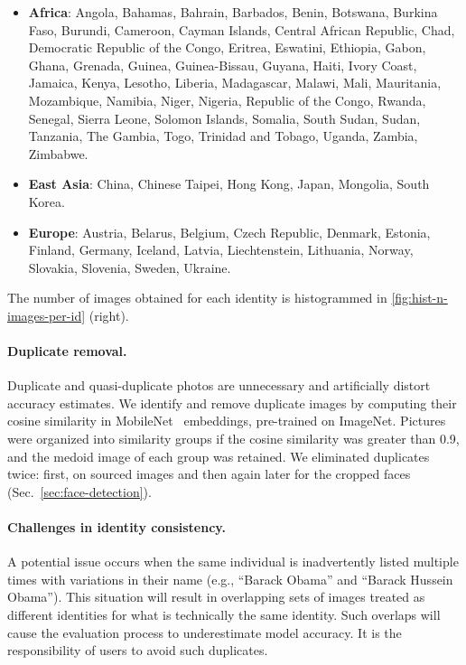 \documentclass[10pt,twocolumn,letterpaper]{article}
\begin{document}
\begin{appendices}
\begin{itemize}
    \item \textbf{Africa}: Angola, Bahamas, Bahrain, Barbados, Benin, Botswana, Burkina Faso, Burundi, Cameroon, Cayman Islands, Central African Republic, Chad, Democratic Republic of the Congo, Eritrea, Eswatini, Ethiopia, Gabon, Ghana, Grenada, Guinea, Guinea-Bissau, Guyana, Haiti, Ivory Coast, Jamaica, Kenya, Lesotho, Liberia, Madagascar, Malawi, Mali, Mauritania, Mozambique, Namibia, Niger, Nigeria, Republic of the Congo, Rwanda, Senegal, Sierra Leone, Solomon Islands, Somalia, South Sudan, Sudan, Tanzania, The Gambia, Togo, Trinidad and Tobago, Uganda, Zambia, Zimbabwe.
    \item \textbf{East Asia}: China, Chinese Taipei, Hong Kong, Japan, Mongolia, South Korea.
    \item \textbf{Europe}: Austria, Belarus, Belgium, Czech Republic, Denmark, Estonia, Finland, Germany, Iceland, Latvia, Liechtenstein, Lithuania, Norway,  Slovakia, Slovenia, Sweden, Ukraine.
\end{itemize}

The number of images obtained for each identity is histogrammed in \cref{fig:hist-n-images-per-id} (right).

\paragraph{Duplicate removal.}
Duplicate and quasi-duplicate photos are unnecessary and artificially distort accuracy estimates. We identify and remove duplicate images by computing their cosine similarity in MobileNet~\cite{howard2017mobilenets} embeddings, pre-trained on ImageNet. Pictures were organized into similarity groups if the cosine similarity was greater than 0.9, and the medoid image of each group was retained.
We eliminated duplicates twice: first, on sourced images and then again later for the cropped faces (Sec.~\ref{sec:face-detection}).

\paragraph{Challenges in identity consistency.}
A potential issue occurs when the same individual is inadvertently listed multiple times with variations in their name (e.g., “Barack Obama” and “Barack Hussein Obama”). This situation will result in overlapping sets of images treated as different identities for what is technically the same identity. Such overlaps will cause the evaluation process to underestimate model accuracy. It is the responsibility of users to avoid such duplicates.


\end{appendices}
\end{document}
